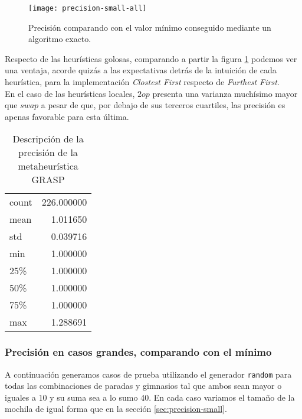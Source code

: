 \begin{figure}[H]
    \centering
    \texttt{[image: precision-small-all]}
    \caption{Precisión comparando con el valor mínimo conseguido mediante un algoritmo exacto.}
    \label{fig:precision-small-all}
\end{figure}

Respecto de las heurísticas golosas, comparando a partir la figura \ref{fig:precision-small-all} podemos ver una ventaja, acorde quizás a las expectativas detrás de la intuición de cada heurística, para la implementación \emph{Clostest First} respecto de \emph{Furthest First}.
\\

En el caso de las heurísticas locales,  $2op$ presenta una varianza muchísimo mayor que $swap$ a pesar de que, por debajo de sus terceros cuartiles, las precisión es apenas favorable para esta última.

\begin{table}[H]
    \begin{center}
        \begin{tabular}{ l | r }
            count  & 226.000000 \\
            mean   &   1.011650 \\
            std    &   0.039716 \\
            min    &   1.000000 \\
            25\%   &   1.000000 \\
            50\%   &   1.000000 \\
            75\%   &   1.000000 \\
            max    &   1.288691 \\
        \end{tabular}
        \caption{Descripción de la precisión de la metaheurística GRASP}\label{tab:precision-small-grasp}
    \end{center}
\end{table}

\subsubsection{Precisión en casos grandes, comparando con el mínimo}
\label{sec:precision-big}

A continuación generamos casos de prueba utilizando el generador \texttt{random} para todas las combinaciones de paradas y gimnasios tal que ambos
sean mayor o iguales a $10$ y su suma sea a lo sumo 40.
En cada caso variamos el tamaño de la mochila de igual forma que en la sección \ref{sec:precision-small}.
\\

